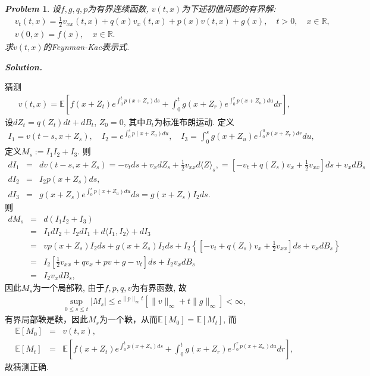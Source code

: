 \documentclass{article}
\newtheorem{problem}{\itshape Problem}
\newtheorem*{Solution}{\itshape Solution}
\renewenvironment{Solution}[1][\itshape Solution.]{%
  \par\noindent\textbf{#1}\quad\CJKfamily{SimSun}%
}{\par}
\begin{document}
\begin{problem}
  设$f,g,q,p$为有界连续函数, $v(t,x)$为下述初值问题的有界解:
  \begin{equation*}
    \begin{aligned}
      & v_t(t, x)=\frac{1}{2} v_{x x}(t, x)+q(x) v_x(t, x)+p(x)v(t,x)+g(x),\quad t>0,\quad x \in \mathbb{R}, \\
      & v(0, x)=f(x),\quad x \in \mathbb{R}.
      \end{aligned}
  \end{equation*}
  求$v(t,x)$的Feynman-Kac表示式.
\end{problem}


  \begin{Solution}
   猜测
   \begin{eqnarray*}
    v(t, x)=\mathbb{E}\left[f\left(x+Z_t\right) e^{\int_0^t p\left(x+Z_s\right) d s}+\int_0^t g\left(x+Z_r\right) e^{\int_0^r p\left(x+Z_u\right) d u} d r\right],
   \end{eqnarray*}
   设$dZ_t = q(Z_t)dt+dB_t$, $Z_0 = 0$, 其中$B_t$为标准布朗运动. 定义
   \begin{eqnarray*}
   I_1 = v(t-s,x+Z_s),\quad I_2 = e^{\int_0^s p\left(x+Z_u\right) d u},\quad I_3 = \int_0^s g\left(x+Z_u\right) e^{\int_0^u p\left(x+Z_r\right) d r}d u,
   \end{eqnarray*}
  定义$M_s := I_1I_2+I_3$. 则
  \begin{eqnarray*}
    dI_1 &=& d v(t-s,x+Z_s) 
    =-v_tds +v_xdZ_s +\frac{1}{2}v_{xx}d\langle Z \rangle _s,
    = \left[-v_t +q(Z_s)v_x +\frac{1}{2}v_{xx}\right]ds + v_xdB_s\\
    dI_2 &=& I_2 p\left(x+Z_s\right) ds, \\
    dI_3 &=& g\left(x+Z_s\right) e^{\int_0^s p\left(x+Z_u\right) d u}ds = g\left(x+Z_s\right)I_2ds.
  \end{eqnarray*}
则
\begin{eqnarray*}
  dM_s &=& d\left(I_1I_2+I_3\right) \\
  &=& I_1dI_2 + I_2dI_1 +d\langle I_1,I_2 \rangle + dI_3 \\
  &=& v p\left(x+Z_s\right) I_2 ds + g\left(x+Z_s\right)I_2ds + I_2\left\{ \left[ -v_t +q(Z_s)v_x +\frac{1}{2}v_{xx}\right]ds + v_xdB_s \right\}\\
  &=& I_2 \left[\frac{1}{2}v_{xx} + qv_x + pv  +g-v_t\right]ds + I_2 v_xdB_s\\
  &=&  I_2 v_xdB_s,
\end{eqnarray*}
因此$M_s$为一个局部鞅, 由于$f,p,q,v$为有界函数, 故
\begin{eqnarray*}
  \sup_{0\le s\le t} |M_s| \le e^{\|p\|_\infty t} \left[\|v\|_\infty + t\|g\|_\infty\right]<\infty,
\end{eqnarray*}
有界局部鞅是鞅，因此$M_s$为一个鞅，从而$\mathbb{E}\left[M_0\right]=\mathbb{E}\left[M_t\right]$, 而
\begin{eqnarray*}
  \mathbb{E}\left[M_0\right]&=& v(t,x),\\
  \mathbb{E}\left[M_t\right]&=&\mathbb{E}\left[f\left(x+Z_t\right) e^{\int_0^t p\left(x+Z_s\right) d s}+\int_0^t g\left(x+Z_r\right) e^{\int_0^r p\left(x+Z_u\right) d u} d r\right],
\end{eqnarray*}
故猜测正确.
\end{Solution}
\end{document}
